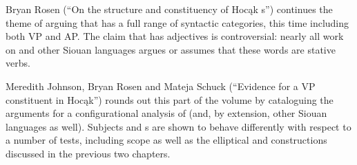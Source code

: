 \begin{refsection}
Bryan Rosen (``On the structure and constituency of Hoc\k{a}k s'') continues the theme of arguing that  has a full range of syntactic categories, this time including both VP and AP. The claim that  has adjectives is controversial: nearly all work on  and other Siouan languages argues or assumes that these words are stative verbs.

Meredith Johnson, Bryan Rosen and Mateja Schuck (``Evidence for a VP constituent in Hoc\k{a}k'') rounds out this part of the volume by cataloguing the arguments for a configurational analysis of  (and, by extension, other Siouan languages as well). Subjects and s are shown to behave differently with respect to a number of tests, including scope as well as the elliptical and  constructions discussed in the previous two chapters.

 
\end{refsection}

